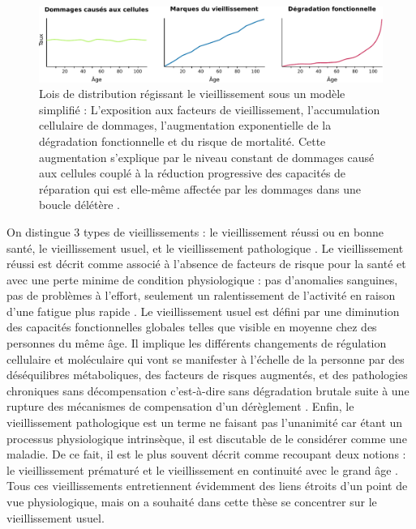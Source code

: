 \begin{figure}
    \centering
    \includegraphics[width=\textwidth]{img/intro/4_aging/intro_4_aging_rate_marks.pdf}
    \caption[Lois de distribution régissant le vieillissement sous un modèle simplifié]{Lois de distribution régissant le vieillissement sous un modèle simplifié :  L'exposition aux facteurs de vieillissement, l'accumulation cellulaire de dommages, l'augmentation exponentielle de la dégradation fonctionnelle et du risque de mortalité. Cette augmentation s'explique par le niveau constant de dommages causé aux cellules couplé à la réduction progressive des capacités de réparation qui est elle-même affectée par les dommages dans une boucle délétère \cite{Todhunter2018}.}
    \label{fig:aging_rate_marks}
\end{figure}

On distingue 3 types de vieillissements : le vieillissement réussi ou en bonne santé, le vieillissement usuel, et le vieillissement pathologique \cite{vanBuchem2004Dec}. Le vieillissement réussi est décrit comme associé à l'absence de facteurs de risque pour la santé et avec une perte minime de condition physiologique : pas d'anomalies sanguines, pas de problèmes à l'effort, seulement un ralentissement de l'activité en raison d'une fatigue plus rapide \cite{Berrut2013}. Le vieillissement usuel est défini par une diminution des capacités fonctionnelles globales telles que visible en moyenne chez des personnes du même âge. Il implique les différents changements de régulation cellulaire et moléculaire qui vont se manifester à l'échelle de la personne par des déséquilibres métaboliques, des facteurs de risques augmentés, et des pathologies chroniques sans décompensation c’est-à-dire sans dégradation brutale suite à une rupture des mécanismes de compensation d'un dérèglement \cite{Berrut2013}. Enfin, le vieillissement pathologique est un terme ne faisant pas l'unanimité car étant un processus physiologique intrinsèque, il est discutable de le considérer comme une maladie. De ce fait, il est le plus souvent décrit comme recoupant deux notions : le vieillissement prématuré et le vieillissement en continuité avec le grand âge \cite{Belmin2014}. Tous ces vieillissements entretiennent évidemment des liens étroits d'un point de vue physiologique, mais on a souhaité dans cette thèse se concentrer sur le vieillissement usuel.


